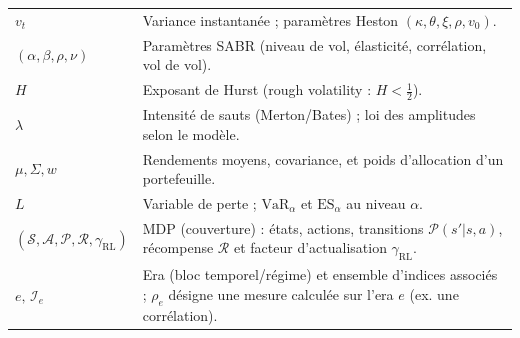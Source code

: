 \documentclass[11pt,a4paper]{article}
\newcommand{\1}{\mathbf{1}}
\begin{document}
\begin{center}
\begin{tabularx}{\textwidth}{@{}lX@{}}
$v_t$ & Variance instantan\'ee ; param\`etres Heston $(\kappa,\theta,\xi,\rho,v_0)$. \\
$(\alpha,\beta,\rho,\nu)$ & Param\`etres SABR (niveau de vol, \'elasticit\'e, corr\'elation, vol de vol). \\
$H$ & Exposant de Hurst (rough volatility : $H<\tfrac12$). \\
$\lambda$ & Intensit\'e de sauts (Merton/Bates) ; loi des amplitudes selon le mod\`ele. \\
$\mu,\Sigma,w$ & Rendements moyens, covariance, et poids d'allocation d'un portefeuille. \\
$L$ & Variable de perte ; $\mathrm{VaR}_\alpha$ et $\mathrm{ES}_\alpha$ au niveau $\alpha$. \\
$(\mathcal{S},\mathcal{A},\mathcal{P},\mathcal{R},\gamma_{\mathrm{RL}})$ & MDP (couverture) : \'etats, actions, transitions $\mathcal{P}(s'|s,a)$, r\'ecompense $\mathcal{R}$ et facteur d'actualisation $\gamma_{\mathrm{RL}}$. \\
$e,\,\mathcal{I}_e$ & Era (bloc temporel/r\'egime) et ensemble d'indices associ\'es ; $\rho_e$ d\'esigne une mesure calcul\'ee sur l'era $e$ (ex. une corr\'elation). \\
\bottomrule
\end{tabularx}
\end{center}

\end{document}

